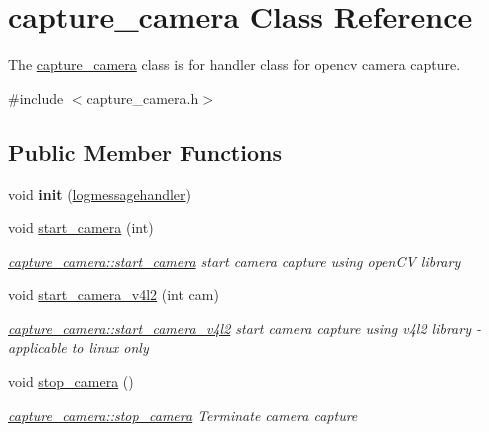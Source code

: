 \hypertarget{classcapture__camera}{}\section{capture\+\_\+camera Class Reference}
\label{classcapture__camera}


The \mbox{\hyperlink{classcapture__camera}{capture\+\_\+camera}} class is for handler class for opencv camera capture.  




{\ttfamily \#include $<$capture\+\_\+camera.\+h$>$}

\subsection*{Public Member Functions}
\begin{DoxyCompactItemize}
\item 
\mbox{\label{classcapture__camera_a1bed8b2feef994db895ed1ca8c03b7d6}} 
void {\bfseries init} (\mbox{\hyperlink{classlogmessagehandler}{logmessagehandler}})
\item 
void \mbox{\hyperlink{classcapture__camera_a1a47efefa0b820beacee88b5332dc01f}{start\+\_\+camera}} (int)
\begin{DoxyCompactList}\small\item\em \mbox{\hyperlink{classcapture__camera_a1a47efefa0b820beacee88b5332dc01f}{capture\+\_\+camera\+::start\+\_\+camera}} start camera capture using open\+CV library \end{DoxyCompactList}\item 
void \mbox{\hyperlink{classcapture__camera_a73588d980bf53b1372b3f2b36363e726}{start\+\_\+camera\+\_\+v4l2}} (int cam)
\begin{DoxyCompactList}\small\item\em \mbox{\hyperlink{classcapture__camera_a73588d980bf53b1372b3f2b36363e726}{capture\+\_\+camera\+::start\+\_\+camera\+\_\+v4l2}} start camera capture using v4l2 library -\/ applicable to linux only \end{DoxyCompactList}\item 
\mbox{\label{classcapture__camera_a7ecd4399b7d25b3f32dc58e437370a2d}} 
void \mbox{\hyperlink{classcapture__camera_a7ecd4399b7d25b3f32dc58e437370a2d}{stop\+\_\+camera}} ()
\begin{DoxyCompactList}\small\item\em \mbox{\hyperlink{classcapture__camera_a7ecd4399b7d25b3f32dc58e437370a2d}{capture\+\_\+camera\+::stop\+\_\+camera}} Terminate camera capture \end{DoxyCompactList}\item 

\end{DoxyCompactItemize}
